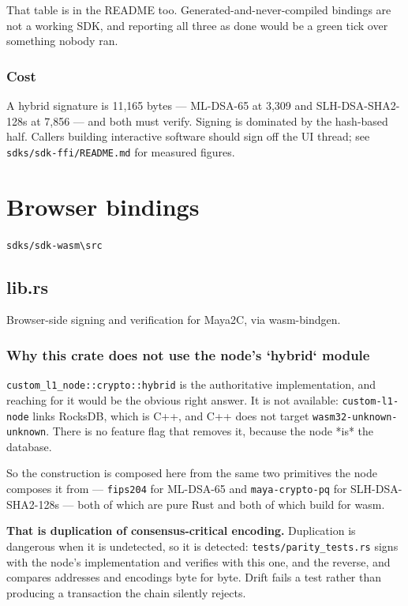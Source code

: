 \documentclass[11pt,a4paper]{article}
\begin{document}
That table is in the README too. Generated-and-never-compiled bindings are
not a working SDK, and reporting all three as done would be a green tick
over something nobody ran.

\subsubsection{Cost}

A hybrid signature is 11,165 bytes — ML-DSA-65 at 3,309 and
SLH-DSA-SHA2-128s at 7,856 — and both must verify. Signing is dominated by
the hash-based half. Callers building interactive software should sign off
the UI thread; see \texttt{sdks/sdk-ffi/README.md} for measured figures.

\section{Browser bindings}
\noindent\texttt{sdks/sdk-wasm\textbackslash{}src}

\subsection{lib.rs}
Browser-side signing and verification for Maya2C, via wasm-bindgen.

\subsubsection{Why this crate does not use the node's `hybrid` module}

\texttt{custom\_l1\_node::crypto::hybrid} is the authoritative implementation, and
reaching for it would be the obvious right answer. It is not available:
\texttt{custom-l1-node} links RocksDB, which is C++, and C++ does not target
\texttt{wasm32-unknown-unknown}. There is no feature flag that removes it, because
the node *is* the database.

So the construction is composed here from the same two primitives the node
composes it from — \texttt{fips204} for ML-DSA-65 and \texttt{maya-crypto-pq} for
SLH-DSA-SHA2-128s — both of which are pure Rust and both of which build for
wasm.

\textbf{That is duplication of consensus-critical encoding.} Duplication is
dangerous when it is undetected, so it is detected: \texttt{tests/parity\_tests.rs}
signs with the node's implementation and verifies with this one, and the
reverse, and compares addresses and encodings byte for byte. Drift fails a
test rather than producing a transaction the chain silently rejects.
\end{document}
